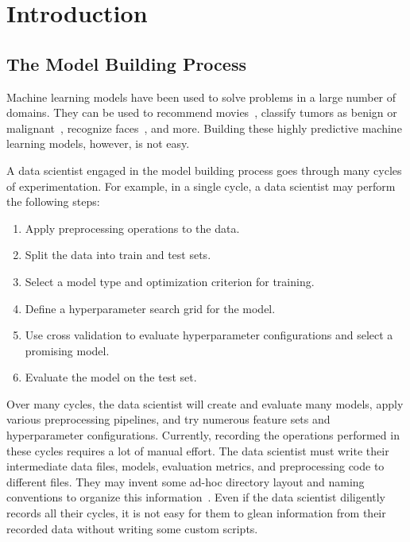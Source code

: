 \chapter{Introduction}
\section{The Model Building Process}
Machine learning models have been used to solve problems in a large number of
domains. They can be used to recommend movies~\cite{netflixprize}, 
classify tumors as benign or malignant~\cite{tumorprediction}, recognize faces~\cite{deepface}, and more. 
Building these highly predictive machine learning models, however, is not easy. 

A data scientist engaged in the model building process goes through many cycles of
experimentation. For example, in a single cycle, a data scientist may perform the
following steps:

\begin{enumerate}
  \item Apply preprocessing operations to the data.
  \item Split the data into train and test sets.
  \item Select a model type and optimization criterion for training.
  \item Define a hyperparameter search grid for the model.
  \item Use cross validation to evaluate hyperparameter configurations and select a 
    promising model.
  \item Evaluate the model on the test set.
\end{enumerate}

Over many cycles, the data scientist will create and evaluate many models,
apply various preprocessing pipelines, and try numerous feature sets and hyperparameter
configurations. Currently, recording the operations performed in these cycles requires
a lot of manual effort. The data scientist must write their intermediate data files, models, evaluation metrics,
and preprocessing code to different files. They may invent some ad-hoc directory layout 
and naming conventions to organize this information~\cite{kaggledirectory}. Even if the data scientist
diligently records all their cycles, it is not easy for them to glean information from their
recorded data without writing some custom scripts.

